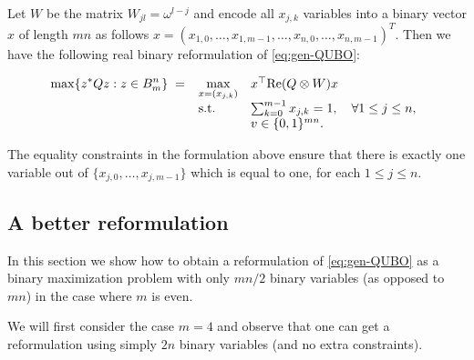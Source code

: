 \documentclass{article}
\theoremstyle{definition}
\begin{document}
Let $W$ be the matrix $W_{jl}=\omega^{l-j}$ and encode all $x_{j,k}$ variables into a binary vector $x$ of length $mn$ as follows $x=(x_{1,0},\ldots,x_{1,m-1},\ldots,x_{n,0},\ldots,x_{n,m-1})^T$. Then we have the following real binary reformulation of \eqref{eq:gen-QUBO}:

\begin{equation}\label{eq:basic-reformulation}
\max \{ z^* Q z : z \in B_m^n \} \; = \;
    \begin{array}[t]{ll}
        \underset{x=(x_{j,k})}{\text{max}} & x^\top \text{Re}(Q\otimes W)x\\
        \text{s.t. }& \sum_{k=0}^{m-1} x_{j,k}=1,\quad \forall 1\le j\le n,\\
        & v\in \{0,1\}^{mn}.
    \end{array}
\end{equation}

The equality constraints in the formulation above ensure that there is exactly one variable out of $\{x_{j,0},\ldots,x_{j,m-1}\}$ which is equal to one, for each $1\leq j\leq n$.

\subsection{A better reformulation}

In this section we show how to obtain a reformulation of \eqref{eq:gen-QUBO} as a binary maximization problem with only $mn/2$ binary variables (as opposed to $mn$) in the case where $m$ is even.

We will first consider the case $m=4$ and observe that one can get a reformulation using simply $2n$ binary variables (and no extra constraints).
\end{document}
